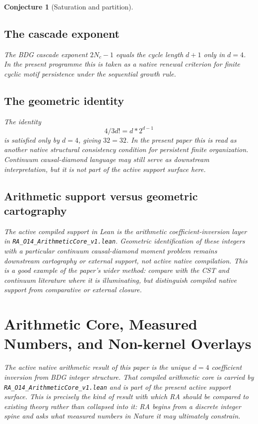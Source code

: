 \documentclass[11pt]{article}
\def\frac#1#2{#1/#2}%
\def\cdot{*}%
\newtheorem{conjecture}{Conjecture}
\begin{document}
\begin{conjecture}[Saturation and partition]
\subsection{The cascade exponent}

The BDG cascade exponent $2N_c-1$ equals the cycle length $d+1$ only in $d=4$. In the present programme this is taken as a native renewal criterion for finite cyclic motif persistence under the sequential growth rule.

\subsection{The geometric identity}

The identity
\[
\frac{4}{3}d! = d\cdot 2^{d-1}
\]
is satisfied only by $d=4$, giving $32=32$. In the present paper this is read as another native structural consistency condition for persistent finite organization. Continuum causal-diamond language may still serve as downstream interpretation, but it is not part of the active support surface here.

\subsection{Arithmetic support versus geometric cartography}

The active compiled support in Lean is the arithmetic coefficient-inversion layer in \texttt{RA\_O14\_ArithmeticCore\_v1.lean}. Geometric identification of these integers with a particular continuum causal-diamond moment problem remains downstream cartography or external support, not active native compilation. This is a good example of the paper's wider method: compare with the CST and continuum literature where it is illuminating, but distinguish compiled native support from comparative or external closure.

\section{Arithmetic Core, Measured Numbers, and Non-kernel Overlays}
\label{sec:couplings}

The active native arithmetic result of this paper is the unique $d=4$ coefficient inversion from BDG integer structure. That compiled arithmetic core is carried by \texttt{RA\_O14\_ArithmeticCore\_v1.lean} and is part of the present active support surface. This is precisely the kind of result with which RA should be compared to existing theory rather than collapsed into it: RA begins from a discrete integer spine and asks what measured numbers in Nature it may ultimately constrain.


\end{conjecture}
\end{document}
